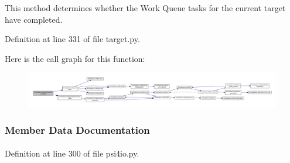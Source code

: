 \-This method determines whether the \-Work \-Queue tasks for the current target have completed. 



\-Definition at line 331 of file target.\-py.



\-Here is the call graph for this function\-:\nopagebreak
\begin{figure}[H]
\begin{center}
\leavevmode
\includegraphics[width=350pt]{classforcebalance_1_1target_1_1Target_af6099ec09486213869dba2491bd8ea04_cgraph}
\end{center}
\end{figure}




\subsubsection{\-Member \-Data \-Documentation}
\hypertarget{classforcebalance_1_1psi4io_1_1RDVR3__Psi4_a8c26d354891fd4b35233d0ce5cfe093f}{
\paragraph[{bidirect}]{}}\label{classforcebalance_1_1psi4io_1_1RDVR3__Psi4_a8c26d354891fd4b35233d0ce5cfe093f}


\-Definition at line 300 of file psi4io.\-py.

\hypertarget{classforcebalance_1_1psi4io_1_1RDVR3__Psi4_a00806559809d8530de8733239a0b42d3}{
\paragraph[{callderivs}]{}}\label{classforcebalance_1_1psi4io_1_1RDVR3__Psi4_a00806559809d8530de8733239a0b42d3}


